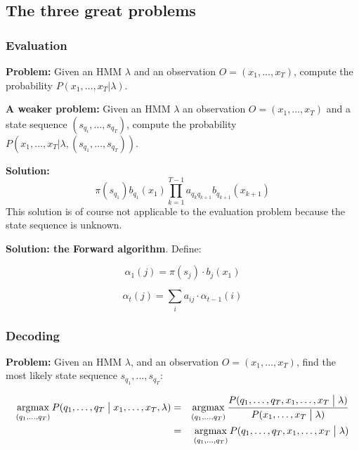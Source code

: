 \subsection{The three great problems}

\subsubsection{Evaluation}

\textbf{Problem:} Given an HMM $\lambda$ and an observation $O = (x_1, \ldots, x_T)$, compute the probability $P(x_1, \ldots, x_T | \lambda)$.

\vspace{10pt}

\textbf{A weaker problem:} Given an HMM $\lambda$ an observation $O = (x_1, \ldots, x_T)$ and a state sequence $(s_{q_i}, \ldots, s_{q_T})$, compute the probability $P(x_1, \ldots, x_T | \lambda, (s_{q_1}, \ldots, s_{q_T}))$.

\vspace{5pt}

\textbf{Solution:}
\begin{equation}
    \pi(s_{q_1}) b_{q_1}(x_1) \prod\limits_{k = 1}^{T - 1} a_{q_{k}q_{k+1}} b_{q_{k+1}}(x_{k+1})
\end{equation}
This solution is of course not applicable to the evaluation problem because the state sequence is unknown.

\vspace{10pt}

\textbf{Solution: the Forward algorithm}. Define:

\begin{equation}
    \alpha_1(j) = \pi(s_j) \cdot b_j(x_1)
\end{equation}

\begin{equation}
    \alpha_t(j) = \sum\limits_i a_{ij} \cdot \alpha_{t-1}(i)
\end{equation}

\subsubsection{Decoding}

\textbf{Problem:} Given an HMM $\lambda$, and an observation $O = (x_1, \ldots, x_T)$, find the most likely state sequence $s_{q_1}, \ldots, s_{q_T}$:

\begin{eqnarray*}
    \operatorname*{\arg\!\max}_{(q_1, \ldots, q_T)} P(q_1, \ldots, q_T \bigm| x_1, \ldots, x_T, \lambda)
    &=& \operatorname*{\arg\!\max}_{(q_1, \ldots, q_T)} \frac{P(q_1, \ldots, q_T, x_1, \ldots, x_T \bigm| \lambda)}{P(x_1, \ldots, x_T \bigm| \lambda)} \\
    &=& \operatorname*{\arg\!\max}_{(q_1, \ldots, q_T)} P(q_1, \ldots, q_T, x_1, \ldots, x_T \bigm| \lambda)
\end{eqnarray*}

